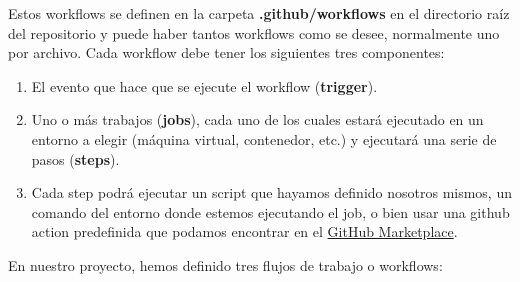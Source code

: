 Estos workflows se definen en la carpeta \textbf{.github/workflows} en el directorio raíz
del repositorio y puede haber tantos workflows como se desee, normalmente uno por archivo.
Cada workflow debe tener los siguientes tres componentes:

    \begin{enumerate}
        \item El evento que hace que se ejecute el workflow (\textbf{trigger}).
        \item Uno o más trabajos (\textbf{jobs}), cada uno de los cuales estará ejecutado en
        un entorno a elegir (máquina virtual, contenedor, etc.) y ejecutará una serie de
        pasos (\textbf{steps}).
        \item Cada step podrá ejecutar un script que hayamos definido nosotros mismos, un
        comando del entorno donde estemos ejecutando el job, o bien usar una github action
        predefinida que podamos encontrar en el
        \href{https://github.com/marketplace?type=actions}{GitHub Marketplace}.
    \end{enumerate}

En nuestro proyecto, hemos definido tres flujos de trabajo o workflows:

